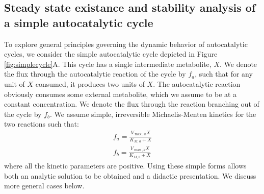 \subsection{Steady state existance and stability analysis of a simple autocatalytic cycle}
To explore general principles governing the dynamic behavior of autocatalytic cycles, we consider the simple autocatalytic cycle depicted in Figure \ref{fig:simplecycle}A.
This cycle has a single intermediate metabolite, $X$.
We denote the flux through the autocatalytic reaction of the cycle by $f_a$, such that for any unit of $X$ consumed, it produces two units of $X$.
The autocatalytic reaction obviously consumes some external metabolite, which we assume to be at a constant concentration.
We denote the flux through the reaction branching out of the cycle by $f_b$.
    We assume simple, irreversible Michaelis-Menten kinetics for the two reactions such that:
    \begin{eqnarray*}
      f_a = \frac{V_{\max,a}X}{K_{M,a}+X} \\
      f_b = \frac{V_{\max,b}X}{K_{M,b}+X}
    \end{eqnarray*}
    where all the kinetic parameters are positive.
    Using these simple forms allows both an analytic solution to be obtained and a didactic presentation.
    We discuss more general cases below.
